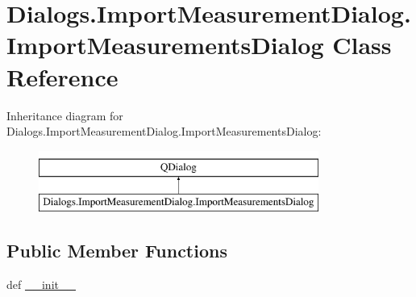 \hypertarget{classDialogs_1_1ImportMeasurementDialog_1_1ImportMeasurementsDialog}{\section{Dialogs.\-Import\-Measurement\-Dialog.\-Import\-Measurements\-Dialog Class Reference}
\label{classDialogs_1_1ImportMeasurementDialog_1_1ImportMeasurementsDialog}
}
Inheritance diagram for Dialogs.\-Import\-Measurement\-Dialog.\-Import\-Measurements\-Dialog\-:\begin{figure}[H]
\begin{center}
\leavevmode
\includegraphics[height=2.000000cm]{classDialogs_1_1ImportMeasurementDialog_1_1ImportMeasurementsDialog}
\end{center}
\end{figure}
\subsection*{Public Member Functions}
\begin{DoxyCompactItemize}
\item 
def \hyperlink{classDialogs_1_1ImportMeasurementDialog_1_1ImportMeasurementsDialog_a9c8cfb8e464c19582f50bd8c2be40078}{\-\_\-\-\_\-init\-\_\-\-\_\-}
\end{DoxyCompactItemize}
